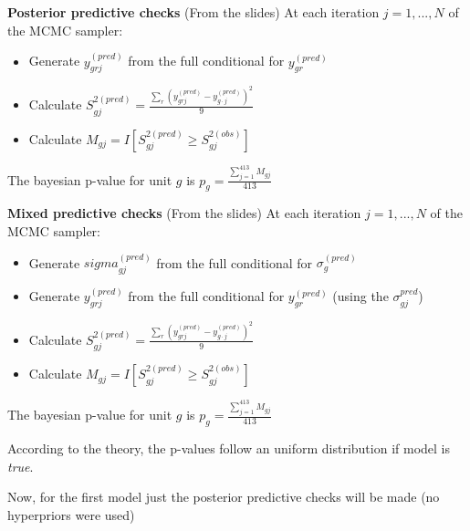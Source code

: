 \documentclass{article}
\begin{document}
\vspace{20mm}
\textbf{Posterior predictive checks} (From the slides) At each iteration $j = 1, ..., N$ of the MCMC sampler:
\begin{itemize}
	\item Generate $y_{grj}^{(pred)}$ from the full conditional for $y_{gr}^{(pred)}$
	\item Calculate  $S_{gj}^{2(pred)} = \frac{\sum_r (y_{grj}^{(pred)} - y_{g \cdot j}^{(pred)})^2}{9}$
	\item Calculate  $M_{gj} = I[S_{gj}^{2(pred)} \geq S_{gj}^{2(obs)}] $ 
\end{itemize}

The bayesian p-value for unit $g$ is $p_g= \frac{\sum_{j=1}^{413} M_{gj}}{413}$

\vspace{20mm}
\textbf{Mixed predictive checks} (From the slides) At each iteration $j = 1, ..., N$ of the MCMC sampler:
\begin{itemize}
	\item Generate $sigma_{gj}^{(pred)}$ from the full conditional for $\sigma_{g}^{(pred)}$
	\item Generate $y_{grj}^{(pred)}$ from the full conditional for $y_{gr}^{(pred)}$ (using the $\sigma_{gj}^{pred}$)
	\item Calculate  $S_{gj}^{2(pred)} = \frac{\sum_r (y_{grj}^{(pred)} - y_{g \cdot j}^{(pred)})^2}{9}$
	\item Calculate  $M_{gj} = I[S_{gj}^{2(pred)} \geq S_{gj}^{2(obs)}] $ 
\end{itemize}

The bayesian p-value for unit $g$ is $p_g= \frac{\sum_{j=1}^{413} M_{gj}}{413}$


\vspace{15mm}
According to the theory, the p-values follow an uniform distribution if model is \textit{true}.

\newpage

Now, for the first model just the posterior predictive checks will be made (no hyperpriors were used)
\end{document}
